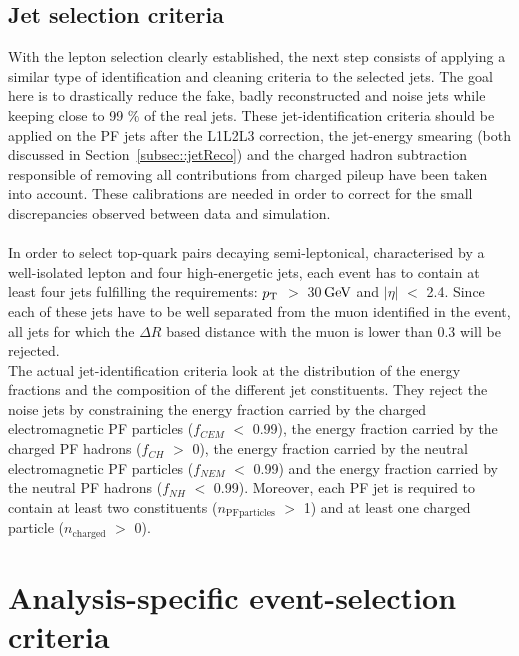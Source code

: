 \subsection{Jet selection criteria}   %
With the lepton selection clearly established, the next step consists of applying a similar type of identification and cleaning criteria to the selected jets.
The goal here is to drastically reduce the fake, badly reconstructed and noise jets while keeping close to 99 $\%$ of the real jets. 
These jet-identification criteria should be applied on the PF jets after the L1L2L3 correction, the jet-energy smearing (both discussed in Section~\ref{subsec::jetReco}) and the charged hadron subtraction responsible of removing all contributions from charged pileup have been taken into account. These calibrations are needed in order to correct for the small discrepancies observed between data and simulation.
\\
\\
In order to select top-quark pairs decaying semi-leptonical, characterised by a well-isolated lepton and four high-energetic jets, each event has to contain at least four jets fulfilling the requirements: $p_{\rm T}$ $>$ 30$\, \mathrm{GeV}$ and $\vert \eta \vert$ $<$ 2.4.
Since each of these jets have to be well separated from the muon identified in the event, all jets for which the $\Delta R$ based distance with the muon is lower than 0.3 will be rejected.
\\
The actual jet-identification criteria look at the distribution of the energy fractions and the composition of the different jet constituents.
They reject the noise jets by constraining the energy fraction carried by the charged electromagnetic PF particles ($f_{CEM}$ $<$ 0.99), the energy fraction carried by the charged PF hadrons ($f_{CH}$ $>$ 0), the energy fraction carried by the neutral electromagnetic PF particles ($f_{NEM}$ $<$ 0.99) and the energy fraction carried by the neutral PF hadrons ($f_{NH}$ $<$ 0.99).
Moreover, each PF jet is required to contain at least two constituents ($n_{\textrm{PFparticles}}$ $>$ 1) and at least one charged particle ($n_{\textrm{charged}}$ $>$ 0).

\section{Analysis-specific event-selection criteria}\label{sec::SpecificSelec}

